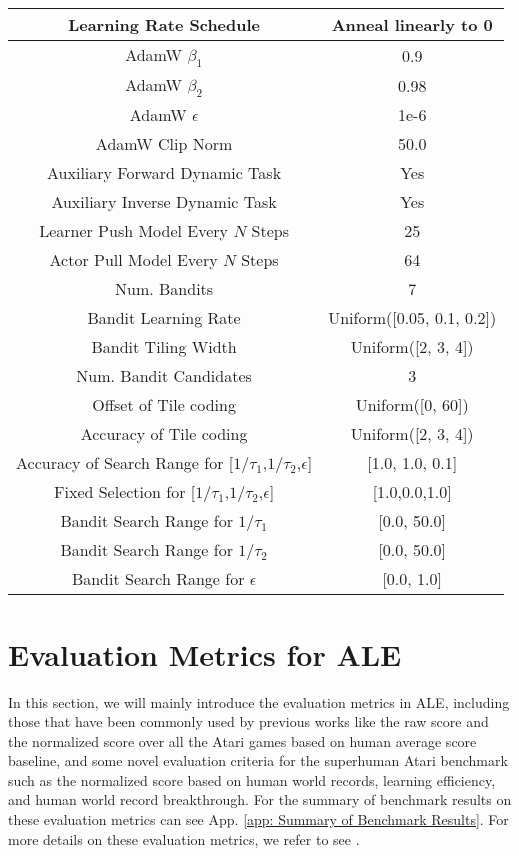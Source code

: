 \documentclass[nohyperref]{article}
\theoremstyle{plain}
\begin{document}
\begin{table}[H]
\begin{center}
\begin{tabular}{|c|c|}
\hline
Learning Rate Schedule & Anneal linearly to 0 \\
\hline
AdamW $\beta_1$ & 0.9 \\
\hline
AdamW $\beta_2$ & 0.98 \\
\hline
AdamW $\epsilon$ & 1e-6 \\
\hline
AdamW Clip Norm & 50.0 \\
\hline
Auxiliary Forward Dynamic Task & Yes \\
\hline
Auxiliary Inverse Dynamic Task & Yes \\
\hline
Learner Push Model Every $N$ Steps & 25 \\
\hline
Actor Pull Model Every $N$ Steps & 64 \\
\hline
Num. Bandits & 7 \\
\hline
Bandit Learning Rate & Uniform([0.05, 0.1, 0.2]) \\
\hline
Bandit Tiling Width & Uniform([2, 3, 4]) \\
\hline
Num. Bandit Candidates & 3 \\
\hline
Offset of Tile coding & Uniform([0, 60]) \\
\hline
Accuracy of Tile coding & Uniform([2, 3, 4]) \\
\hline
Accuracy of Search Range for [$1/\tau_1$,$1/\tau_2$,$\epsilon$]& [1.0, 1.0, 0.1]\\
\hline
Fixed Selection for [$1/\tau_1$,$1/\tau_2$,$\epsilon$]&[1.0,0.0,1.0]\\
\hline
Bandit Search Range for $1/\tau_1$ & [0.0, 50.0] \\
\hline
Bandit Search Range for $1/\tau_2$ & [0.0, 50.0] \\
\hline
Bandit Search Range for $\epsilon$ & [0.0, 1.0] \\
\hline
\end{tabular}
\end{center}
\end{table}
\clearpage


\section{Evaluation Metrics for ALE}
\label{app:Evaluation Metrics for ALE}
In this section, we will mainly introduce the evaluation metrics in ALE, including those that have been commonly used by previous works like the raw score and the normalized score over all the Atari games based on human average score baseline, and some novel evaluation criteria for the superhuman Atari benchmark such as the normalized score based on human world records, learning efficiency, and human world record breakthrough. For the summary of benchmark results on these evaluation metrics can see App. \ref{app: Summary of Benchmark Results}. For more details on these evaluation metrics, we refer to see \citep{review2021_atari}.
\end{document}
